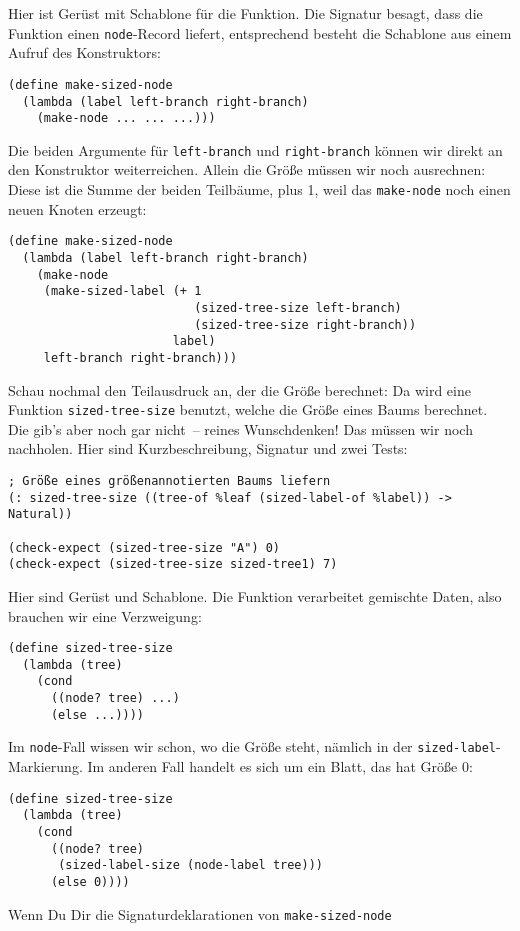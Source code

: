 %
Hier ist Gerüst mit Schablone für die Funktion. Die Signatur besagt,
dass die Funktion einen  \lstinline{node}-Record liefert, entsprechend
besteht die Schablone aus einem Aufruf des Konstruktors:
%
\begin{lstlisting}
(define make-sized-node
  (lambda (label left-branch right-branch)
    (make-node ... ... ...)))
\end{lstlisting}
%
Die beiden Argumente für \lstinline{left-branch} und
\lstinline{right-branch} können wir direkt an den Konstruktor
weiterreichen.  Allein die Größe müssen wir noch ausrechnen: Diese ist
die Summe der beiden Teilbäume, plus 1, weil das \lstinline{make-node}
noch einen neuen Knoten erzeugt:
%
\begin{lstlisting}
(define make-sized-node
  (lambda (label left-branch right-branch)
    (make-node
     (make-sized-label (+ 1
                          (sized-tree-size left-branch)
                          (sized-tree-size right-branch))
                       label)
     left-branch right-branch)))
\end{lstlisting}
%
Schau nochmal den Teilausdruck an, der die Größe berechnet: Da wird
eine Funktion \lstinline{sized-tree-size} benutzt, welche die Größe
eines Baums berechnet.  Die gib's aber noch gar nicht~-- reines
Wunschdenken!  Das müssen wir noch nachholen.  Hier sind
Kurzbeschreibung, Signatur und zwei Tests:
%
\begin{lstlisting}
; Größe eines größenannotierten Baums liefern
(: sized-tree-size ((tree-of %leaf (sized-label-of %label)) -> Natural))

(check-expect (sized-tree-size "A") 0)
(check-expect (sized-tree-size sized-tree1) 7)
\end{lstlisting}
%
Hier sind Gerüst und Schablone.  Die Funktion verarbeitet gemischte
Daten, also brauchen wir eine Verzweigung:
%
\begin{lstlisting}
(define sized-tree-size
  (lambda (tree)
    (cond
      ((node? tree) ...)
      (else ...))))
\end{lstlisting}
%
Im \lstinline{node}-Fall wissen wir schon, wo die Größe steht, nämlich
in der \lstinline{sized-label}-Markierung.  Im anderen Fall handelt es
sich um ein Blatt, das hat Größe 0:
%
\begin{lstlisting}
(define sized-tree-size
  (lambda (tree)
    (cond
      ((node? tree)
       (sized-label-size (node-label tree)))
      (else 0))))
\end{lstlisting}
%
Wenn Du Dir die Signaturdeklarationen von \lstinline{make-sized-node}
